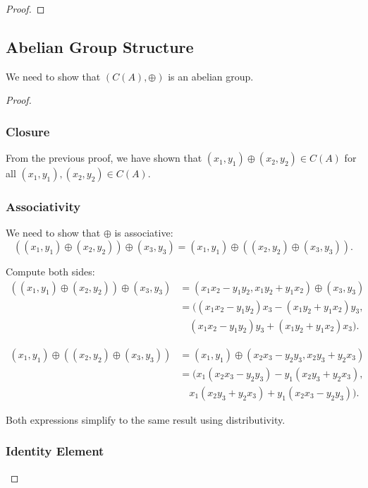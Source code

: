 \documentclass[12pt]{amsart}
\theoremstyle{definition}
\numberwithin{equation}{section}
\begin{document}
\begin{exercise}{4}
\begin{proof}
    \end{proof}
    
    \subsection*{Abelian Group Structure}
    
    We need to show that \((C(A), \oplus)\) is an abelian group.
    
    \begin{proof} \( \)
    
    \subsubsection*{Closure}
    
    From the previous proof, we have shown that \((x_1, y_1) \oplus (x_2, y_2) \in C(A)\) for all \((x_1, y_1), (x_2, y_2) \in C(A)\).
    
    \subsubsection*{Associativity}
    
    We need to show that \(\oplus\) is associative:
    \[
    ((x_1, y_1) \oplus (x_2, y_2)) \oplus (x_3, y_3) = (x_1, y_1) \oplus ((x_2, y_2) \oplus (x_3, y_3)).
    \]
    
    Compute both sides:
    \[
    \begin{aligned}
    ((x_1, y_1) \oplus (x_2, y_2)) \oplus (x_3, y_3) &= (x_1 x_2 - y_1 y_2, x_1 y_2 + y_1 x_2) \oplus (x_3, y_3) \\
    &= ((x_1 x_2 - y_1 y_2) x_3 - (x_1 y_2 + y_1 x_2) y_3, \\
    &\quad (x_1 x_2 - y_1 y_2) y_3 + (x_1 y_2 + y_1 x_2) x_3).
    \end{aligned}
    \]
    
    \[
    \begin{aligned}
    (x_1, y_1) \oplus ((x_2, y_2) \oplus (x_3, y_3)) &= (x_1, y_1) \oplus (x_2 x_3 - y_2 y_3, x_2 y_3 + y_2 x_3) \\
    &= (x_1 (x_2 x_3 - y_2 y_3) - y_1 (x_2 y_3 + y_2 x_3), \\
    &\quad x_1 (x_2 y_3 + y_2 x_3) + y_1 (x_2 x_3 - y_2 y_3)).
    \end{aligned}
    \]
    
    Both expressions simplify to the same result using distributivity.
    
    \subsubsection*{Identity Element}
    

\end{proof}
\end{exercise}
\end{document}
